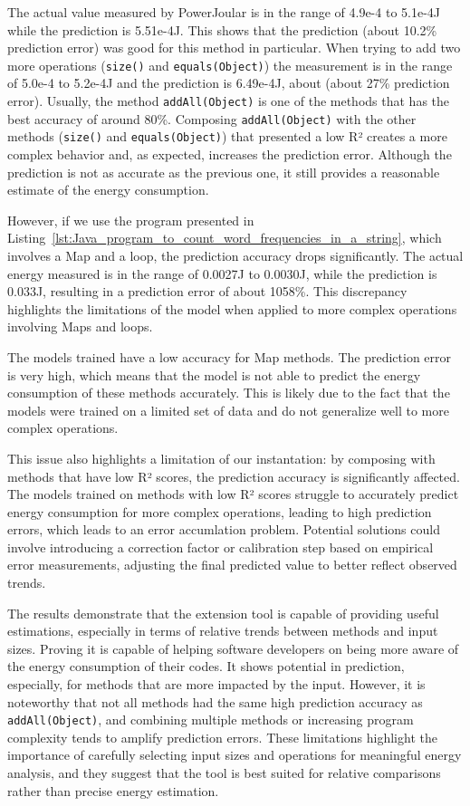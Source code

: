 The actual value measured by PowerJoular is in the range of 4.9e-4 to 5.1e-4J while the prediction is 5.51e-4J. This shows that the prediction (about 10.2\% prediction error) was good for this method in particular.
When trying to add two more operations (\texttt{size()} and \texttt{equals(Object)}) the measurement is in the range of 5.0e-4 to 5.2e-4J and the prediction is 6.49e-4J, about (about 27\% prediction error). Usually, the method \texttt{addAll(Object)} is one of the methods that has the best accuracy of around 80\%. Composing \texttt{addAll(Object)} with the other methods (\texttt{size()} and \texttt{equals(Object)}) that presented a low R² creates a more complex behavior and, as expected, increases the prediction error. Although the prediction is not as accurate as the previous one, it still provides a reasonable estimate of the energy consumption.

However, if we use the program presented in Listing~\ref{lst:Java_program_to_count_word_frequencies_in_a_string}, which involves a Map and a loop, the prediction accuracy drops significantly. The actual energy measured is in the range of 0.0027J to 0.0030J, while the prediction is 0.033J, resulting in a prediction error of about 1058\%. This discrepancy highlights the limitations of the model when applied to more complex operations involving Maps and loops.

The models trained have a low accuracy for Map methods. The prediction error is very high, which means that the model is not able to predict the energy consumption of these methods accurately. This is likely due to the fact that the models were trained on a limited set of data and do not generalize well to more complex operations.

This issue also highlights a limitation of our instantation: by composing with methods that have low R² scores, the prediction accuracy is significantly affected. The models trained on methods with low R² scores struggle to accurately predict energy consumption for more complex operations, leading to high prediction errors, which leads to an error accumlation problem. Potential solutions could involve introducing a correction factor or calibration step based on empirical error measurements, adjusting the final predicted value to better reflect observed trends.

{\color{blue}The results demonstrate that the extension tool is capable of providing useful estimations, especially in terms of relative trends between methods and input sizes. Proving it is capable of helping software developers on being more aware of the energy consumption of their codes. It shows potential in prediction, especially, for methods that are more impacted by the input. However, it is noteworthy that not all methods had the same high prediction accuracy as \texttt{addAll(Object)}, and combining multiple methods or increasing program complexity tends to amplify prediction errors.
These limitations highlight the importance of carefully selecting input sizes and operations for meaningful energy analysis, and they suggest that the tool is best suited for relative comparisons rather than precise energy estimation.}

